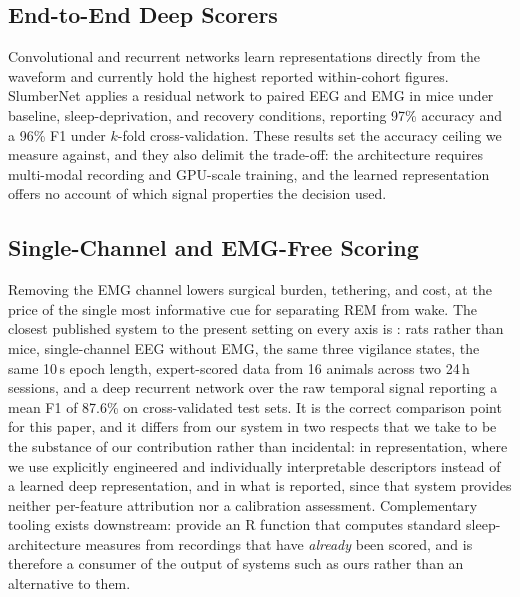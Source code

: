 \subsection{End-to-End Deep Scorers}
Convolutional and recurrent networks learn representations directly from the waveform and currently hold the highest reported within-cohort figures. SlumberNet \citep{jha2024_slumbernet} applies a residual network to paired EEG and EMG in mice under baseline, sleep-deprivation, and recovery conditions, reporting 97\% accuracy and a 96\% F1 under $k$-fold cross-validation. These results set the accuracy ceiling we measure against, and they also delimit the trade-off: the architecture requires multi-modal recording and GPU-scale training, and the learned representation offers no account of which signal properties the decision used.

\subsection{Single-Channel and EMG-Free Scoring}
Removing the EMG channel lowers surgical burden, tethering, and cost, at the price of the single most informative cue for separating REM from wake. The closest published system to the present setting on every axis is \citet{smith2025_ratlstm}: rats rather than mice, single-channel EEG without EMG, the same three vigilance states, the same 10\,s epoch length, expert-scored data from 16 animals across two 24\,h sessions, and a deep recurrent network over the raw temporal signal reporting a mean F1 of 87.6\% on cross-validated test sets. It is the correct comparison point for this paper, and it differs from our system in two respects that we take to be the substance of our contribution rather than incidental: in representation, where we use explicitly engineered and individually interpretable descriptors instead of a learned deep representation, and in what is reported, since that system provides neither per-feature attribution nor a calibration assessment. Complementary tooling exists downstream: \citet{gamble2025_sleepinvestigator} provide an R function that computes standard sleep-architecture measures from recordings that have \emph{already} been scored, and is therefore a consumer of the output of systems such as ours rather than an alternative to them.

